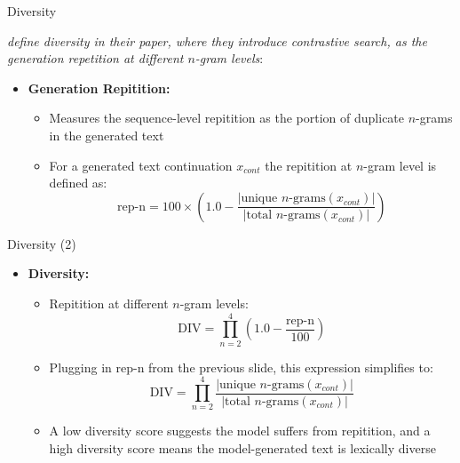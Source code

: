 \documentclass[11pt,compress,t,notes=noshow, xcolor=table]{beamer}
\begin{document}
\begin{vbframe}{Diversity}

 \textit{define diversity in their paper, where they introduce contrastive search, as the generation repetition at different $n$-gram levels}:

\begin{itemize}
    \item \textbf{Generation Repitition:}
    \begin{itemize}
        \item Measures the sequence-level repitition as the portion of duplicate $n$-grams in the generated text
        \item For a generated text continuation $x_{cont}$ the repitition at $n$-gram level is defined as: 
        $$\text{rep-n} = 100 \times \left(1.0 - \frac{|\text{unique $n$-grams}(x_{cont})|}{|\text{total $n$-grams}(x_{cont})|}\right)$$ 
    \end{itemize}
\end{itemize}

\end{vbframe}

\begin{vbframe}{Diversity (2)}

\vfill

\begin{itemize}
\item \textbf{Diversity:}
    \begin{itemize}
        \item Repitition at different $n$-gram levels:
        $$\text{DIV} = \prod_{n=2}^{4}\left(1.0 - \frac{\text{rep-n}}{100}\right)$$
        \item Plugging in rep-n from the previous slide, this expression simplifies to:
        $$\text{DIV} = \prod_{n=2}^{4} \frac{|\text{unique $n$-grams}(x_{cont})|}{|\text{total $n$-grams}(x_{cont})|}$$
        \item A low diversity score suggests the model suffers from repitition, and a high diversity score means the model-generated text is lexically diverse
    \end{itemize}
\end{itemize}

\vfill
        
\end{vbframe}

\end{document}
